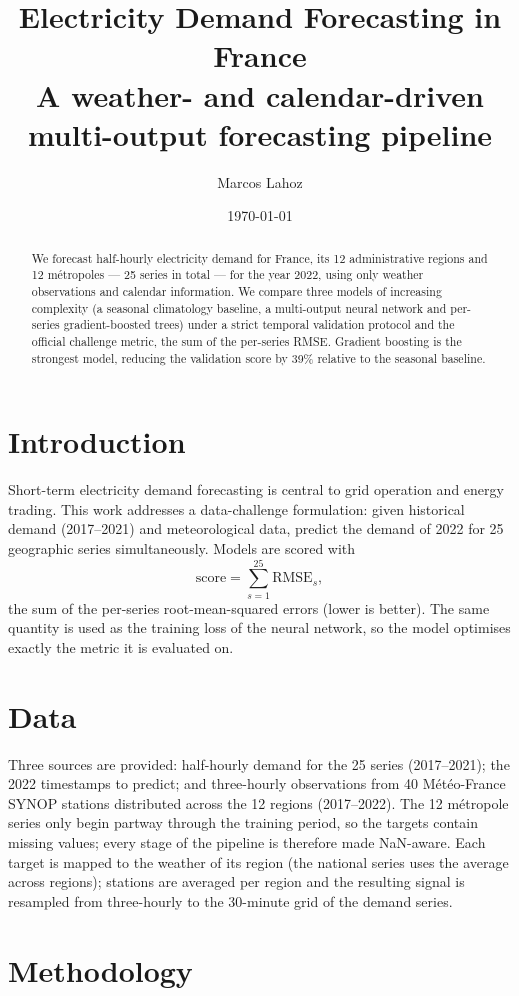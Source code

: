\documentclass[11pt,a4paper]{article}
\title{\textbf{Electricity Demand Forecasting in France}\\
\large A weather- and calendar-driven multi-output forecasting pipeline}
\author{Marcos Lahoz}
\date{\today}
\begin{document}
\maketitle

\begin{abstract}
We forecast half-hourly electricity demand for France, its 12 administrative
regions and 12 métropoles --- 25 series in total --- for the year 2022, using
only weather observations and calendar information. We compare three models of
increasing complexity (a seasonal climatology baseline, a multi-output neural
network and per-series gradient-boosted trees) under a strict temporal
validation protocol and the official challenge metric, the sum of the
per-series RMSE. Gradient boosting is the strongest model, reducing the
validation score by 39\% relative to the seasonal baseline.
\end{abstract}

\section{Introduction}
Short-term electricity demand forecasting is central to grid operation and
energy trading. This work addresses a data-challenge formulation: given
historical demand (2017--2021) and meteorological data, predict the demand of
2022 for 25 geographic series simultaneously. Models are scored with
\[
\text{score} = \sum_{s=1}^{25} \mathrm{RMSE}_s,
\]
the sum of the per-series root-mean-squared errors (lower is better). The same
quantity is used as the training loss of the neural network, so the model
optimises exactly the metric it is evaluated on.

\section{Data}
Three sources are provided: half-hourly demand for the 25 series
(2017--2021); the 2022 timestamps to predict; and three-hourly observations
from 40 Météo-France SYNOP stations distributed across the 12 regions
(2017--2022). The 12 métropole series only begin partway through the training
period, so the targets contain missing values; every stage of the pipeline is
therefore made NaN-aware. Each target is mapped to the weather of its region
(the national series uses the average across regions); stations are averaged
per region and the resulting signal is resampled from three-hourly to the
30-minute grid of the demand series.

\section{Methodology}
\end{document}
